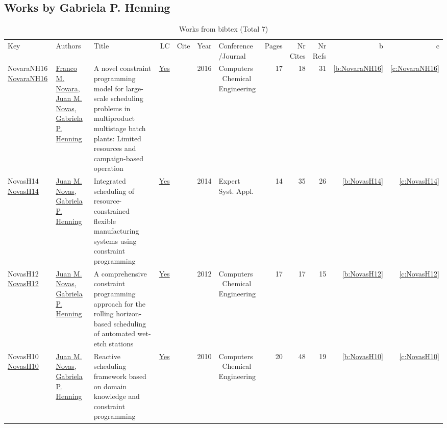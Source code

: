 \subsection{Works by Gabriela P. Henning}
\label{sec:a598}
{\scriptsize
\begin{longtable}{>{\raggedright\arraybackslash}p{3cm}>{\raggedright\arraybackslash}p{6cm}>{\raggedright\arraybackslash}p{6.5cm}rrrp{2.5cm}rrrrr}
\rowcolor{white}\caption{Works from bibtex (Total 7)}\\ \toprule
\rowcolor{white}Key & Authors & Title & LC & Cite & Year & \shortstack{Conference\\/Journal} & Pages & \shortstack{Nr\\Cites} & \shortstack{Nr\\Refs} & b & c \\ \midrule\endhead
\bottomrule
\endfoot
NovaraNH16 \href{https://doi.org/10.1016/j.compchemeng.2016.04.030}{NovaraNH16} & \hyperref[auth:a597]{Franco M. Novara}, \hyperref[auth:a531]{Juan M. Novas}, \hyperref[auth:a598]{Gabriela P. Henning} & A novel constraint programming model for large-scale scheduling problems in multiproduct multistage batch plants: Limited resources and campaign-based operation & \href{works/NovaraNH16.pdf}{Yes} & \cite{NovaraNH16} & 2016 & Computers \  Chemical Engineering & 17 & 18 & 31 & \ref{b:NovaraNH16} & \ref{c:NovaraNH16}\\
NovasH14 \href{https://doi.org/10.1016/j.eswa.2013.09.026}{NovasH14} & \hyperref[auth:a531]{Juan M. Novas}, \hyperref[auth:a598]{Gabriela P. Henning} & Integrated scheduling of resource-constrained flexible manufacturing systems using constraint programming & \href{works/NovasH14.pdf}{Yes} & \cite{NovasH14} & 2014 & Expert Syst. Appl. & 14 & 35 & 26 & \ref{b:NovasH14} & \ref{c:NovasH14}\\
NovasH12 \href{https://doi.org/10.1016/j.compchemeng.2012.01.005}{NovasH12} & \hyperref[auth:a531]{Juan M. Novas}, \hyperref[auth:a598]{Gabriela P. Henning} & A comprehensive constraint programming approach for the rolling horizon-based scheduling of automated wet-etch stations & \href{works/NovasH12.pdf}{Yes} & \cite{NovasH12} & 2012 & Computers \  Chemical Engineering & 17 & 17 & 15 & \ref{b:NovasH12} & \ref{c:NovasH12}\\
NovasH10 \href{https://doi.org/10.1016/j.compchemeng.2010.07.011}{NovasH10} & \hyperref[auth:a531]{Juan M. Novas}, \hyperref[auth:a598]{Gabriela P. Henning} & Reactive scheduling framework based on domain knowledge and constraint programming & \href{works/NovasH10.pdf}{Yes} & \cite{NovasH10} & 2010 & Computers \  Chemical Engineering & 20 & 48 & 19 & \ref{b:NovasH10} & \ref{c:NovasH10}\\

\end{longtable}}
